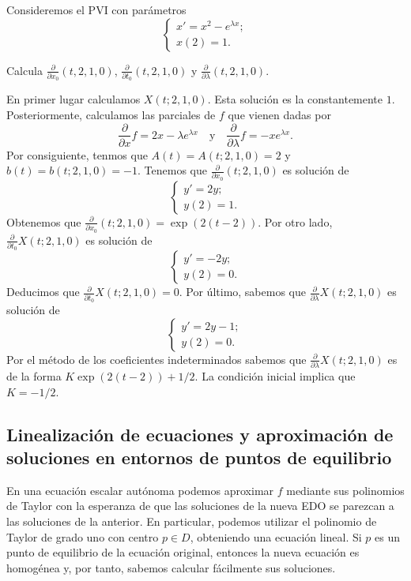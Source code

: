 \begin{ex}
  Consideremos el PVI con parámetros
  \[
    \begin{cases}
      x' = x^2 - e^{\lambda x}; \\
      x(2) = 1.
    \end{cases}
  \]

  Calcula $\frac{\partial}{\partial x_0}(t, 2, 1, 0)$, $\frac{\partial}{\partial t_0}(t, 2, 1, 0)$ y
  $\frac{\partial}{\partial \lambda}(t, 2, 1, 0)$.

  En primer lugar calculamos $X(t; 2,1,0)$.  Esta solución es la constantemente $1$. Posteriormente,
  calculamos las parciales de $f$ que vienen dadas por
  \[ \frac{\partial}{\partial x}f = 2x - \lambda e^{\lambda x} \quad \text{y} \quad
    \frac{\partial}{\partial \lambda}f = - x e^{\lambda x}. \] Por consiguiente, tenmos que
  $A(t) = A(t; 2, 1, 0) = 2$ y $b(t) = b(t; 2,1,0) = -1$.  Tenemos que
  $\frac{\partial}{\partial x_0}(t; 2,1,0)$ es solución de
  \[
    \begin{cases}
      y' = 2y; \\
      y(2) = 1.
    \end{cases}
  \]
  Obtenemos que $\frac{\partial}{\partial x_0}(t; 2,1,0) = \exp(2(t-2))$.  Por otro lado,
  $\frac{\partial}{\partial t_0}X(t;2,1,0)$ es solución de
  \[
    \begin{cases}
      y' = -2y; \\
      y(2) = 0.
    \end{cases}
  \]
  Deducimos que $\frac{\partial}{\partial t_0}X(t;2,1,0) = 0$. Por último, sabemos que
  $\frac{\partial}{\partial \lambda}X(t; 2,1,0)$ es solución de
  \[
    \begin{cases}
      y' = 2y -1;\\
      y(2) = 0.
    \end{cases}
  \]
  Por el método de los coeficientes indeterminados sabemos que
  $\frac{\partial}{\partial \lambda}X(t; 2,1,0)$ es de la forma $K \exp(2(t-2)) + 1/2$. La condición
  inicial implica que $K = -1/2$.
\end{ex}


\subsection{Linealización de ecuaciones y aproximación de soluciones en entornos de puntos de
  equilibrio}


En una ecuación escalar autónoma podemos aproximar $f$ mediante sus polinomios de Taylor con la
esperanza de que las soluciones de la nueva EDO se parezcan a las soluciones de la anterior. En
particular, podemos utilizar el polinomio de Taylor de grado uno con centro $p \in D$, obteniendo
una ecuación lineal. Si $p$ es un punto de equilibrio de la ecuación original, entonces la nueva
ecuación es homogénea y, por tanto, sabemos calcular fácilmente sus soluciones.

